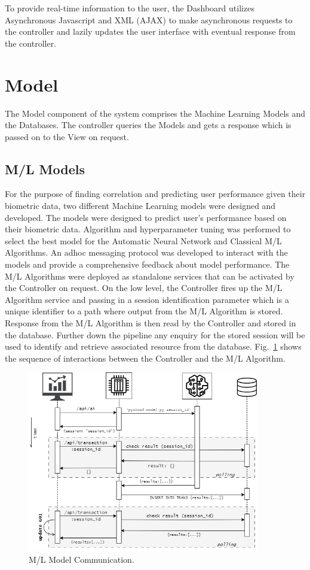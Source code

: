 To provide real-time information to the user, the Dashboard utilizes Asynchronous Javascript and XML (AJAX) to make asynchronous requests to
the controller and lazily updates the user interface with eventual response from the controller. 

\section{Model}
The Model component of the system comprises the Machine Learning Models and the Databases. The controller queries the Models and gets a 
response which is passed on to the View on request.

\subsection{M/L Models}
For the purpose of finding correlation and predicting user performance given their biometric data, two different Machine Learning models 
were designed and developed. The models were designed to predict user's performance based on their biometric data. 
Algorithm and hyperparameter tuning was performed to select the best model for the Automatic Neural Network and Classical M/L Algorithms.
An adhoc messaging protocol was developed to interact with the models and provide a comprehensive feedback about model performance. 
The M/L Algorithms were deployed as standalone services that can be activated by the Controller on request. On the low level, the Controller
fires up the M/L Algorithm service and passing in a session identification parameter which is a unique identifier to a path where output from the
M/L Algorithm is stored. Response from the M/L Algorithm is then read by the Controller and stored in the database. Further down the pipeline
any enquiry for the stored session will be used to identify and retrieve associated resource from the database. Fig.~\ref{image:model_comm}
shows the sequence of interactions between the Controller and the M/L Algorithm.

\begin{figure}[h!]
    \includegraphics[width=0.9\textwidth]{images/model_comm.png}
    \caption{M/L Model Communication.}
    \label{image:model_comm}
\end{figure}

